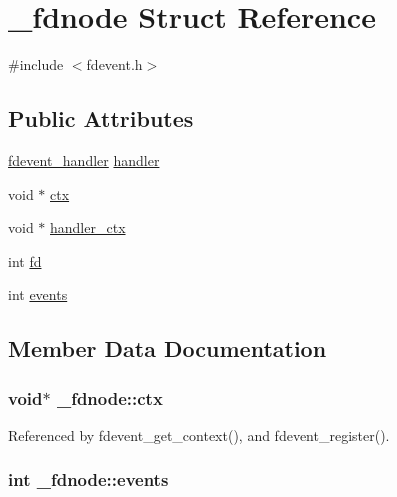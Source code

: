 \hypertarget{struct__fdnode}{\section{\-\_\-fdnode Struct Reference}
\label{struct__fdnode}
}


{\ttfamily \#include $<$fdevent.\-h$>$}

\subsection*{Public Attributes}
\begin{DoxyCompactItemize}
\item 
\hyperlink{fdevent_8h_a3897a2cae3216b96b6845a004b9816e9}{fdevent\-\_\-handler} \hyperlink{struct__fdnode_a197ee75ecdf4018d2b6eec823dc67ff4}{handler}
\item 
void $\ast$ \hyperlink{struct__fdnode_ab89a325bfe82c899da15e739a15925b4}{ctx}
\item 
void $\ast$ \hyperlink{struct__fdnode_a2f6ad4b40f7d71ff6dd0e9521c09447e}{handler\-\_\-ctx}
\item 
int \hyperlink{struct__fdnode_a00a11f60bb26e73cb7fb6e84bb4ffbc4}{fd}
\item 
int \hyperlink{struct__fdnode_a7e07481ffe95680437dc71676daa80a5}{events}
\end{DoxyCompactItemize}


\subsection{Member Data Documentation}
\hypertarget{struct__fdnode_ab89a325bfe82c899da15e739a15925b4}{
\subsubsection[{ctx}]{\setlength{\rightskip}{0pt plus 5cm}void$\ast$ \-\_\-fdnode\-::ctx}}\label{struct__fdnode_ab89a325bfe82c899da15e739a15925b4}


Referenced by fdevent\-\_\-get\-\_\-context(), and fdevent\-\_\-register().

\hypertarget{struct__fdnode_a7e07481ffe95680437dc71676daa80a5}{
\subsubsection[{events}]{\setlength{\rightskip}{0pt plus 5cm}int \-\_\-fdnode\-::events}}\label{struct__fdnode_a7e07481ffe95680437dc71676daa80a5}


